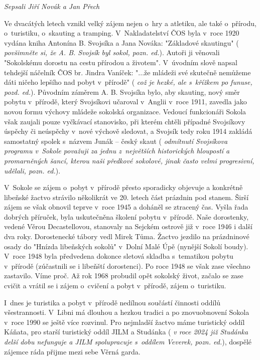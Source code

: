 \documentclass[a5paper, 11pt, twoside]{article}
\newcommand{\pozned}[1]{%
\textit{#1}}
\begin{document}
\begin{center}
  \textit{Sepsali Jiří Novák a Jan Přech}
\end{center}

Ve dvacátých letech vznikl velký zájem nejen o~hry a atletiku, ale také
o~přírodu, o~turistiku, o~skauting a tramping. V~Nakladatelství ČOS byla
v~roce 1920 vydána kniha Antonína B. Svojsíka a Jana Nováka: "Základové
skautingu" (\pozned{povšimněte si, že A. B. Svojsík byl sokol, pozn.
ed.}). Autoři ji věnovali "Sokolskému dorostu na cestu přírodou a
životem". V~úvodním slově napsal tehdejší náčelník ČOS br. Jindra
Vaníček: "...že mládeži své skutečně nemůžeme dáti ničeho lepšího nad
pobyt v~přírodě" (\pozned{což je hezké, ale s~křížkem po funuse, pozd.
ed.}). Původním záměrem A. B. Svojsíka bylo, aby skauting, nový směr
pobytu v~přírodě, který Svojsíkovi učaroval v~Anglii v~roce 1911,
zavedla jako novou formu výchovy mládeže sokolská organizace. Vedoucí
funkcionáři Sokola však zaujali pouze vyčkávací stanovisko, při kterém
chtěli případné Svojsíkovy úspěchy či neúspěchy v~nové výchově sledovat,
a Svojsík tedy roku 1914 zakládá samostatný spolek s~názvem Junák --
český skaut (\pozned{odmítnutí Svojsíkova programu v~Sokole považuji za
jednu z~největších historických hloupostí a promarněných šancí, kterou
naši předkové sokolové, jinak často velmi progresivní, udělali, pozn.
ed.}).

V~Sokole se zájem o~pobyt v~přírodě přesto sporadicky objevuje a
konkrétně libeňské žactvo strávilo několikrát ve 20. letech část
prázdnin pod stanem. Širší zájem se však obnovil teprve v~roce 1945 a
doháněl se ztracený čas. Vyšla řada dobrých příruček, byla uskutečněna
školení pobytu v~přírodě. Naše dorostenky, vedené Věrou Decastellovou,
stanovaly na Sejckém ostrově již v~roce 1946 i další dva roky.
Dorostenecké tábory vedl Mirek Tůma. Žactvo jezdilo na prázdninové osady
do "Hnízda libeňských sokolů" v~Dolní Malé Úpě (nynější Sokolí boudy).
V~roce 1948 byla předvedena dokonce sletová skladba s~tematikou pobytu
v~přírodě (zúčastnili se i libeňští dorostenci). Po roce 1948 se však zase
všechno zastavilo. Víme proč. Až rok 1968 probudil opět sokolský život,
začalo se zase cvičit a vrátil se i zájem o~cvičení a pobyt v~přírodě,
zájem o~turistiku.

I~dnes je turistika a pobyt v~přírodě nedílnou součástí činnosti oddílů
všestrannosti. V~Libni má dlouhou a hezkou tradici a po znovuobnovení
Sokola v~roce 1990 se ještě více rozvinul. Pro nejmladší žactvo máme
turistický oddíl Káňata, pro starší turistický oddíl JILM a Studánka
(\pozned{v roce 2024 již Studánka delší dobu nefunguje a JILM spolupracuje
s~oddílem Veverek, pozn. ed.}), dospělé zájemce ráda přijme mezi sebe
Věrná garda.
\end{document}
